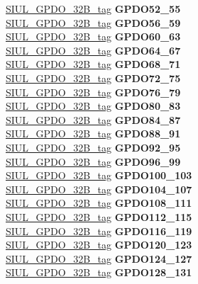 \begin{DoxyCompactItemize}
\begin{tabbing}
\>\>\mbox{\hyperlink{unionSIUL__GPDO__32B__tag}{SIUL\_GPDO\_32B\_tag}} {\bfseries GPDO52\_55}\\
\>\>\mbox{\hyperlink{unionSIUL__GPDO__32B__tag}{SIUL\_GPDO\_32B\_tag}} {\bfseries GPDO56\_59}\\
\>\>\mbox{\hyperlink{unionSIUL__GPDO__32B__tag}{SIUL\_GPDO\_32B\_tag}} {\bfseries GPDO60\_63}\\
\>\>\mbox{\hyperlink{unionSIUL__GPDO__32B__tag}{SIUL\_GPDO\_32B\_tag}} {\bfseries GPDO64\_67}\\
\>\>\mbox{\hyperlink{unionSIUL__GPDO__32B__tag}{SIUL\_GPDO\_32B\_tag}} {\bfseries GPDO68\_71}\\
\>\>\mbox{\hyperlink{unionSIUL__GPDO__32B__tag}{SIUL\_GPDO\_32B\_tag}} {\bfseries GPDO72\_75}\\
\>\>\mbox{\hyperlink{unionSIUL__GPDO__32B__tag}{SIUL\_GPDO\_32B\_tag}} {\bfseries GPDO76\_79}\\
\>\>\mbox{\hyperlink{unionSIUL__GPDO__32B__tag}{SIUL\_GPDO\_32B\_tag}} {\bfseries GPDO80\_83}\\
\>\>\mbox{\hyperlink{unionSIUL__GPDO__32B__tag}{SIUL\_GPDO\_32B\_tag}} {\bfseries GPDO84\_87}\\
\>\>\mbox{\hyperlink{unionSIUL__GPDO__32B__tag}{SIUL\_GPDO\_32B\_tag}} {\bfseries GPDO88\_91}\\
\>\>\mbox{\hyperlink{unionSIUL__GPDO__32B__tag}{SIUL\_GPDO\_32B\_tag}} {\bfseries GPDO92\_95}\\
\>\>\mbox{\hyperlink{unionSIUL__GPDO__32B__tag}{SIUL\_GPDO\_32B\_tag}} {\bfseries GPDO96\_99}\\
\>\>\mbox{\hyperlink{unionSIUL__GPDO__32B__tag}{SIUL\_GPDO\_32B\_tag}} {\bfseries GPDO100\_103}\\
\>\>\mbox{\hyperlink{unionSIUL__GPDO__32B__tag}{SIUL\_GPDO\_32B\_tag}} {\bfseries GPDO104\_107}\\
\>\>\mbox{\hyperlink{unionSIUL__GPDO__32B__tag}{SIUL\_GPDO\_32B\_tag}} {\bfseries GPDO108\_111}\\
\>\>\mbox{\hyperlink{unionSIUL__GPDO__32B__tag}{SIUL\_GPDO\_32B\_tag}} {\bfseries GPDO112\_115}\\
\>\>\mbox{\hyperlink{unionSIUL__GPDO__32B__tag}{SIUL\_GPDO\_32B\_tag}} {\bfseries GPDO116\_119}\\
\>\>\mbox{\hyperlink{unionSIUL__GPDO__32B__tag}{SIUL\_GPDO\_32B\_tag}} {\bfseries GPDO120\_123}\\
\>\>\mbox{\hyperlink{unionSIUL__GPDO__32B__tag}{SIUL\_GPDO\_32B\_tag}} {\bfseries GPDO124\_127}\\
\>\>\mbox{\hyperlink{unionSIUL__GPDO__32B__tag}{SIUL\_GPDO\_32B\_tag}} {\bfseries GPDO128\_131}\\

\end{tabbing}
\end{DoxyCompactItemize}

